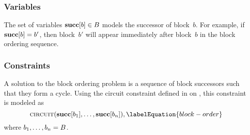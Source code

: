 \subsubsection{Variables}

The set of \glspl{variable} \mbox{$\mVar{succ}[b] \in \mBlockSet$} models the
successor of block~$b$\hspace{-.5pt}.
%
For example, if \mbox{$\mVar{succ}[b] = b'$}, then \gls{block}~$b'$ will appear
immediately after \gls{block}~$b$ in the \gls{block ordering} sequence.


\subsubsection{Constraints}

A \gls{solution} to the \gls{block ordering} problem is a sequence of
\gls{block} successors such that they form a \gls{cycle}.
%
Using the \gls{circuit constraint} defined in
 on , this
\gls{constraint} is modeled as
%
\begin{equation}
  \mCircuit(\mVar{succ}[b_1], \ldots, \mVar{succ}[b_n]),
  \labelEquation{block-order}
\end{equation}
%
where \mbox{$b_1, \ldots, b_n = B$}.

